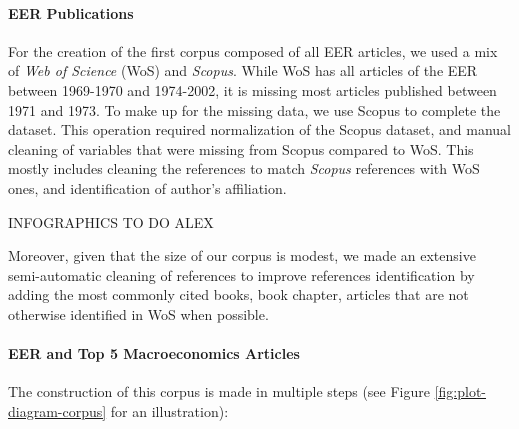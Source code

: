 \documentclass[]{elsarticle} %
\begin{document}
\hypertarget{eer-publications}{%
\paragraph*{EER Publications}\label{eer-publications}}

For the creation of the first corpus composed of all EER articles, we
used a mix of \emph{Web of Science} (WoS) and \emph{Scopus}. While WoS
has all articles of the EER between 1969-1970 and 1974-2002, it is
missing most articles published between 1971 and 1973. To make up for
the missing data, we use Scopus to complete the dataset. This operation
required normalization of the Scopus dataset, and manual cleaning of
variables that were missing from Scopus compared to WoS. This mostly
includes cleaning the references to match \emph{Scopus} references with
WoS ones, and identification of author's affiliation.

INFOGRAPHICS TO DO ALEX

Moreover, given that the size of our corpus is modest, we made an
extensive semi-automatic cleaning of references to improve references
identification by adding the most commonly cited books, book chapter,
articles that are not otherwise identified in WoS when possible.

\hypertarget{eer-top5-macro}{%
\paragraph*{EER and Top 5 Macroeconomics
Articles}\label{eer-top5-macro}}

The construction of this corpus is made in multiple steps (see Figure
\ref{fig:plot-diagram-corpus} for an illustration):
\end{document}
